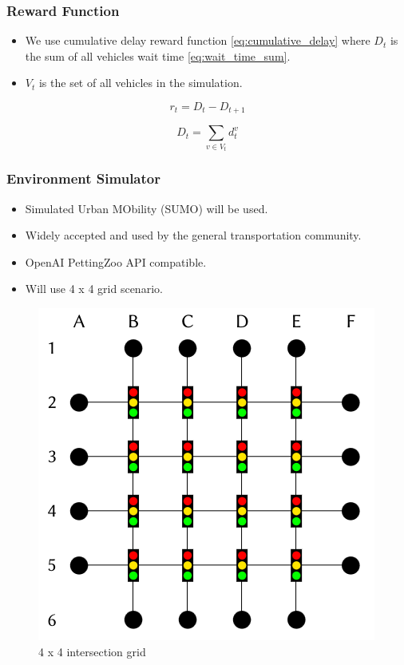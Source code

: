 \documentclass[compress,12pt]{beamer}
\begin{document}
\begin{frame}[bg=arguelles.png]
      \frametitle{Reward Function}
      \begin{itemize}
      \item We use cumulative delay reward function \ref{eq:cumulative_delay} where \(D_t\) is the sum of all vehicles wait time \ref{eq:wait_time_sum}\cite{10.3389/frai.2022.805823}.
      \item \(V_t\) is the set of all vehicles in the simulation.
      \end{itemize}

    \begin{equation}
    r_t = D_t - D_{t+1}
    \label{eq:cumulative_delay}
    \end{equation}

    \begin{equation}
    D_t = \sum_{v \in V_t} d_t^v
    \label{eq:wait_time_sum}
    \end{equation}
\end{frame}

\begin{frame}[bg=arguelles.png]
      \frametitle{Environment Simulator}
      \begin{itemize}
      \item Simulated Urban MObility (SUMO) will be used\cite{sumorl}.
      \item Widely accepted and used by the general transportation community\cite{ault2021reinforcement}.
      \item OpenAI PettingZoo API compatible\cite{terry2021pettingzoo}.
      \item Will use 4 x 4 grid scenario.
      \end{itemize}

    \begin{figure}[htbp]
      \centering
      \includegraphics[width=0.4\linewidth]{4x4.png}
      \caption{4 x 4 intersection grid\cite{DBLP:journals/corr/abs-2004-04778}}
      \label{fig:intersection_grid}
    \end{figure}

\end{frame}
\end{document}

